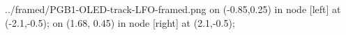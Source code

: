 \documentclass[preview]{standalone}
\begin{document}
\begin{zoomed}{../framed/PGB1-OLED-track-LFO-framed.png}
     \spy [size=2cm] on (-0.85,0.25) in node [left] at (-2.1,-0.5);
     \spy [size=2cm] on (1.68, 0.45) in node [right] at (2.1,-0.5);
\end{zoomed}
\end{document}
